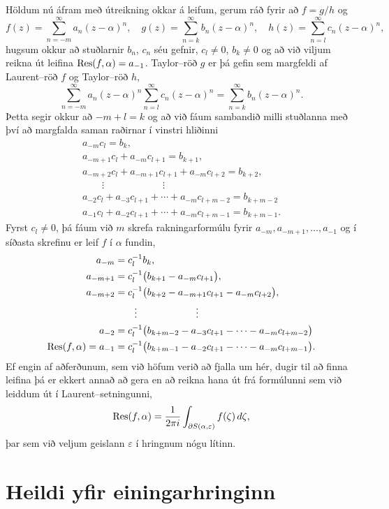 Höldum nú áfram með útreikning okkar á leifum, gerum ráð fyrir að
$f=g/h$ og  
 $$f(z)=\sum\limits_{n=-m}^{\infty}a_n(z-\alpha)^n, \quad
g(z)=\sum\limits_{n=k}^{\infty}b_n(z-\alpha)^n, \quad
h(z)=\sum\limits_{n=l}^{\infty}c_n(z-\alpha)^n, 
 $$
hugsum okkur að stuðlarnir $b_n$, $c_n$ séu gefnir, $c_l\neq 0$,
$b_k\neq 0$  og að við
viljum reikna út leifina ${\operatorname{Res}}(f,\alpha)=a_{-1}$.  
Taylor--röð  $g$ er þá gefin sem
margfeldi af Laurent--röð $f$ og Taylor--röð $h$,
 $$
\sum\limits_{n=-m}^{\infty}a_n(z-\alpha)^n
\sum\limits_{n=l}^{\infty}c_n(z-\alpha)^n=
\sum\limits_{n=k}^{\infty}b_n(z-\alpha)^n.
$$ 
Þetta segir okkur að $-m+l=k$ og að við fáum sambandið milli
stuðlanna með því að margfalda saman raðirnar í vinstri hliðinni
\begin{gather*}
a_{-m}c_l=b_k,\\
a_{-m+1}c_l+a_{-m}c_{l+1}=b_{k+1},\\
a_{-m+2}c_l+a_{-m+1}c_{l+1}+a_{-m}c_{l+2}=b_{k+2},\\
\qquad \vdots\qquad\qquad\qquad\vdots\\
a_{-2}c_l+a_{-3}c_{l+1}+\cdots+a_{-m}c_{l+m-2}=b_{k+m-2}\\
a_{-1}c_l+a_{-2}c_{l+1}+\cdots+a_{-m}c_{l+m-1}=b_{k+m-1}.
\end{gather*}
Fyrst $c_l\neq 0$, þá fáum við $m$ skrefa rakningarformúlu fyrir $a_{-m},
a_{-m+1},\dots, a_{-1}$ og í síðasta skrefinu er leif $f$ í $\alpha$
fundin,
\begin{align*}
a_{-m}&=c_l^{-1}b_k,\\
a_{-m+1}&=c_l^{-1}\big(b_{k+1}
-a_{-m}c_{l+1}\big),\\
a_{-m+2}&=c_l^{-1}\big(b_{k+2}
-a_{-m+1}c_{l+1}-a_{-m}c_{l+2}\big),\\
&\qquad \vdots\qquad\qquad\qquad\vdots\\
a_{-2}&=c_l^{-1}\big(b_{k+m-2}
-a_{-3}c_{l+1}-\cdots-a_{-m}c_{l+m-2}\big)\\
{\operatorname{Res}}(f,\alpha)=a_{-1}&=c_l^{-1}\big(
b_{k+m-1}-a_{-2}c_{l+1}-\cdots-a_{-m}c_{l+m-1}\big).\label{11.1.8}
\end{align*}
Ef engin af aðferðunum, sem við höfum verið að fjalla um hér, dugir
til að finna leifina þá er ekkert annað að gera en að reikna hana út frá
formúlunni sem við leiddum út í Laurent--setningunni,
$$
{\operatorname{Res}}(f,\alpha) = \dfrac 1{2\pi i}\int_{\partial
S(\alpha,\varepsilon)} f(\zeta)\, d\zeta,
$$
þar sem við veljum geislann $\varepsilon$ í hringnum nógu lítinn.


\section{Heildi yfir einingarhringinn} 


